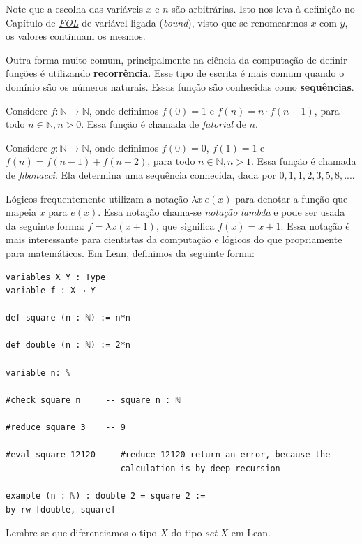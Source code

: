 Note que a escolha das variáveis $x$ e $n$ são arbitrárias. Isto nos leva à
definição no Capítulo de \textit{\hyperlink{chapter.4}{FOL}} de variável
ligada (\textit{bound}), visto que se renomearmos $x$ com $y$, os valores
continuam os mesmos.

 Outra forma muito comum, principalmente na ciência da computação de definir
 funções é utilizando \textbf{recorrência}. Esse tipo de escrita é mais comum
 quando o domínio são os números naturais. Essas função são conhecidas como
 \textbf{sequências}. 

\begin{example}
     Considere $f: \mathbb{N} \to \mathbb{N}$, onde definimos $f(0) = 1$ e
     $f(n) = n\cdot f(n-1)$, para todo $n \in \mathbb{N}, n > 0$. Essa função
     é chamada de \textit{fatorial} de $n$. 
\end{example}

\begin{example}
    Considere $g: \mathbb{N} \to \mathbb{N}$, onde definimos $f(0) = 0$, $f(1)
   = 1$ e $f(n) = f(n-1) + f(n-2)$, para todo $n \in \mathbb{N}, n > 1$. Essa função
   é chamada de \textit{fibonacci}. Ela determina uma sequência conhecida, dada
   por $0, 1, 1, 2, 3, 5 ,8, ...$.  
\end{example}

Lógicos frequentemente utilizam a notação $\lambda x ~e(x)$ para denotar a
função que mapeia $x$ para $e(x)$. Essa notação chama-se \textit{notação
lambda} e pode ser usada da seguinte forma: $f = \lambda x(x + 1)$, que
significa $f(x) = x + 1$. Essa notação é mais interessante para cientistas da
computação e lógicos do que propriamente para matemáticos. Em Lean, definimos
da seguinte forma:

\begin{lstlisting}
variables X Y : Type
variable f : X → Y

def square (n : ℕ) := n*n 

def double (n : ℕ) := 2*n

variable n: ℕ 

#check square n     -- square n : ℕ 

#reduce square 3    -- 9

#eval square 12120  -- #reduce 12120 return an error, because the 
                    -- calculation is by deep recursion

example (n : ℕ) : double 2 = square 2 :=
by rw [double, square]
\end{lstlisting}

Lembre-se que diferenciamos o tipo $X$ do tipo $set~X$ em Lean.


